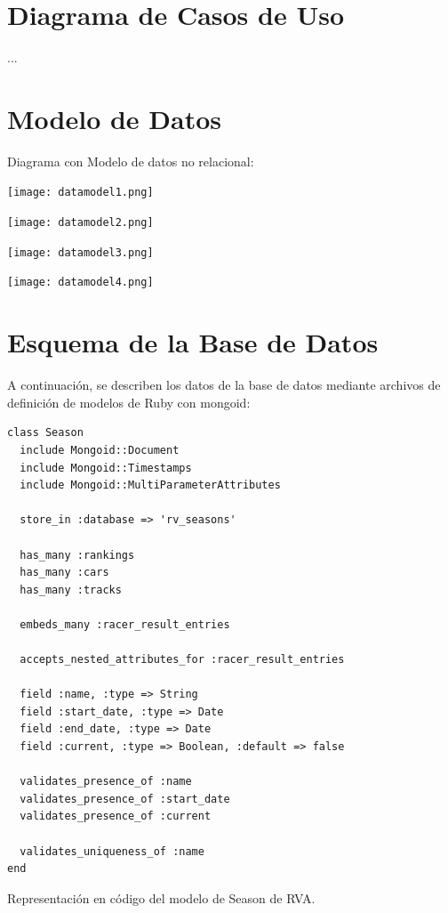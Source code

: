 \section{Diagrama de Casos de Uso}
...

\section{Modelo de Datos}
Diagrama con Modelo de datos no relacional:

\begin{center}
	\texttt{[image: datamodel1.png]}
\end{center}

\begin{center}
	\texttt{[image: datamodel2.png]}
\end{center}


\begin{center}
	\texttt{[image: datamodel3.png]}
\end{center}

\begin{center}
	\texttt{[image: datamodel4.png]}
\end{center}

\section{Esquema de la Base de Datos}
A continuación, se describen los datos de la base de datos mediante archivos de definición de modelos de Ruby con mongoid:

\begin{listing}
  \begin{verbatim}
class Season
  include Mongoid::Document
  include Mongoid::Timestamps
  include Mongoid::MultiParameterAttributes
  
  store_in :database => 'rv_seasons'
  
  has_many :rankings
  has_many :cars
  has_many :tracks
  
  embeds_many :racer_result_entries
  
  accepts_nested_attributes_for :racer_result_entries
  
  field :name, :type => String
  field :start_date, :type => Date
  field :end_date, :type => Date
  field :current, :type => Boolean, :default => false
  
  validates_presence_of :name
  validates_presence_of :start_date
  validates_presence_of :current
  
  validates_uniqueness_of :name
end
  \end{verbatim}
  \caption[Esquema de Season]{Representación en código del modelo de Season de RVA.}
\end{listing}

